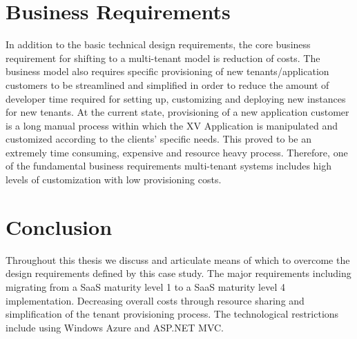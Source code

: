\section{Business Requirements}

In addition to the basic technical design requirements, the core business requirement for shifting to a multi-tenant model is reduction of costs. The business model also requires specific provisioning of new tenants/application customers to be streamlined and simplified in order to reduce the amount of developer time required for setting up, customizing and deploying new instances for new tenants. At the current state, provisioning of a new application customer is a long manual process within which the XV Application is manipulated and customized according to the clients' specific needs. This proved to be an extremely time consuming, expensive and resource heavy process. Therefore, one of the fundamental business requirements multi-tenant systems includes high levels of customization with low provisioning costs.



\section{Conclusion}

Throughout this thesis we discuss and articulate means of which to overcome the design requirements defined by this case study. The major requirements including migrating from a SaaS maturity level 1 to a SaaS maturity level 4 implementation. Decreasing overall costs through resource sharing and simplification of the tenant provisioning process. The technological restrictions include using Windows Azure and ASP.NET MVC.